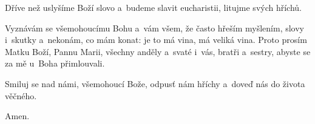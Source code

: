 \Vbardot{} Dříve než uslyšíme Boží slovo a~budeme slavit eucharistii, litujme svých hříchů.

Vyznávám se všemohoucímu Bohu a~vám všem, že často hřeším myšlením, slovy i~skutky a~nekonám, co mám konat:
je to má vina, má veliká vina. Proto prosím Matku Boží, Pannu Marii,
všechny anděly a~svaté i~vás, bratři a~sestry, abyste se za mě u~Boha
přimlouvali.

\Vbardot{} Smiluj se nad námi, všemohoucí Bože, odpusť nám hříchy a~doveď nás do života věčného.

\Rbardot{} Amen.
